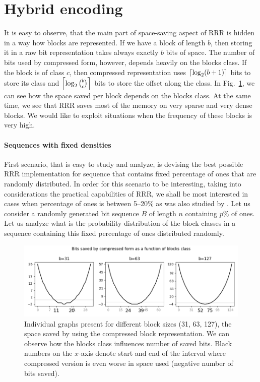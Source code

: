 \section{Hybrid encoding}


It is easy to observe, that the main part of space-saving aspect of RRR is hidden in
a way how blocks are represented. If we have a block of length $b$, then storing it in
a raw bit representation takes always exactly $b$ bits of space. The number of bits used by
compressed form, however, depends heavily on the blocks class. If the block is of class
$c$, then compressed representation uses $\left\lceil \log_2 (b+1) \right\rceil$ bits to store its
class and $\left\lceil \log_2{b\choose c} \right\rceil$ bits to store the offset along the class.
In Fig.~\ref{obr:rrrSpaceSavings}, we can see how the space saved per block depends on
the blocks class. At the same time, we see that RRR saves most of the memory on very
sparse and very dense blocks. We would like to exploit situations when the frequency of
these blocks is very high.

\paragraph{Sequences with fixed densities}

First scenario, that is easy to study and analyze, is devising the best possible RRR
implementation for sequence that contains fixed percentage of ones that are randomly
distributed. In order for this scenario to be interesting, taking into considerations
the practical capabilities of RRR, we shall be most interested in cases when percentage 
of ones is between 5--20\% as was also studied by \cite{navarro2012fast}. Let us consider
a randomly generated bit sequence $B$ of length $n$ containing $p\%$ of ones. Let us
analyze what is the probability distribution of the block classes in a sequence containing
this fixed percentage of ones distributed randomly.
\begin{figure}
	\centerline{
		\includegraphics[width=\textwidth]{images/rrr_space_savings}
	}
	\caption[TODO]{Individual graphs present for different block sizes (31, 63, 127), 
    the space saved by using the compressed block representation. We can observe how
    the blocks class influences number of saved bits. Black numbers on the $x$-axis
    denote start and end of the interval where compressed version is even worse
    in space used (negative number of bits saved).
	}
	\label{obr:rrrSpaceSavings}
\end{figure}

